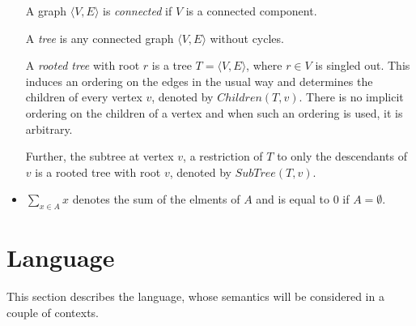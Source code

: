 \documentclass{article}
\begin{document}
\begin{itemize}
  A graph $\langle V, E \rangle$ is \emph{connected} if $V$ is a connected component.

  A \emph{tree} is any connected graph $\langle V, E \rangle$ without cycles.

  A \emph{rooted tree} with root $r$ is a tree $T = \langle V, E \rangle$, where $r \in V$ is singled out. This induces an ordering on the edges in the usual way and determines the children of every vertex $v$, denoted by $Children(T, v)$. There is no implicit ordering on the children of a vertex and when such an ordering is used, it is arbitrary.

  Further, the subtree at vertex $v$, a restriction of $T$ to only the descendants of $v$ is a rooted tree with root $v$, denoted by $SubTree(T, v)$.

\item $\sum_{x \in A}x$ denotes the sum of the elments of $A$ and is equal to $0$ if $A = \emptyset$.
\end{itemize}

\section{Language}
This section describes the language, whose semantics will be considered in a couple of contexts.
\end{document}
